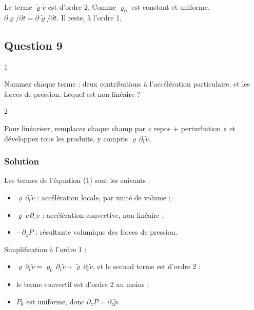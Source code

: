 \documentclass[11pt,a4paper]{article}
\providecommand{\tightlist}{\setlength{\itemsep}{0pt}\setlength{\parskip}{0pt}}
\newcommand{\equationajustee}[1]{%
  \sbox{\boiteequation}{$\displaystyle #1$}%
  \ifdim\wd\boiteequation>\linewidth
    \[\resizebox{\linewidth}{!}{\usebox{\boiteequation}}\]%
  \else
    \[#1\]%
  \fi}
\begin{document}
\equationajustee{\varrho v=\varrho_0\tilde v+\tilde\varrho\,\tilde v.}

Le terme \(\tilde\varrho\tilde v\) est d'ordre 2. Comme \(\varrho_0\) est constant et uniforme, \(\partial\varrho/\partial t=\partial\tilde\varrho/\partial t\). Il reste, à l'ordre 1,

\equationajustee{\boxed{\frac{\partial\tilde\varrho}{\partial t}+\varrho_0\frac{\partial\tilde v}{\partial z}=0}.}

\hypertarget{question-9}{%
\subsection{Question 9}\label{question-9}}

\begin{indication}{1}

Nommez chaque terme : deux contributions à l'accélération particulaire, et les forces de pression. Lequel est non linéaire ?

\end{indication}

\begin{indication}{2}

Pour linéariser, remplacez chaque champ par « repos + perturbation » et développez tous les produits, y compris \(\varrho\,\partial_t\tilde v\).

\end{indication}

\hypertarget{solution-8}{%
\subsubsection{Solution}\label{solution-8}}

Les termes de l'équation (1) sont les suivants :

\begin{itemize}
\tightlist
\item
  \(\varrho\,\partial_t\tilde v\) : accélération locale, par unité de volume ;
\item
  \(\varrho\,\tilde v\,\partial_z\tilde v\) : accélération convective, non linéaire ;
\item
  \(-\partial_zP\) : résultante volumique des forces de pression.
\end{itemize}

Simplification à l'ordre 1 :

\begin{itemize}
\tightlist
\item
  \(\varrho\,\partial_t\tilde v=\varrho_0\,\partial_t\tilde v+\tilde\varrho\,\partial_t\tilde v\), et le second terme est d'ordre 2 ;
\item
  le terme convectif est d'ordre 2 au moins ;
\item
  \(P_0\) est uniforme, donc \(\partial_zP=\partial_z\tilde p\).
\end{itemize}
\end{document}
